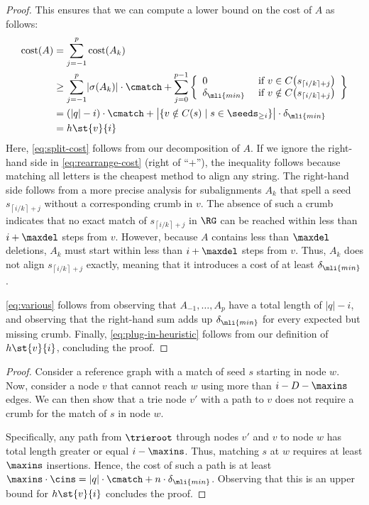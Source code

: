 \begin{proof}
	This ensures that we can compute a lower bound on the cost of $A$ as
	follows:
	\begin{align}
		\text{cost}(A) 
		&= \sum_{j=-1}^{p} \text{cost}(A_k) \label{eq:split-cost} \\
		&\geq \sum_{j=-1}^{p} \lvert \sigma(A_k) \rvert \cdot \cmatch + \sum_{j=0}^{p-1} \left\{ \begin{array}{ll}
			0 & \text{ if } v \in C\!\left(s_{\left\lceil i/k \right\rceil + j}\right) \\
			\delta_\mli{min} & \text{ if } v \notin C\!\left(s_{\left\lceil i/k \right\rceil + j}\right)
		\end{array}\right\} \label{eq:rearrange-cost} \\
		&= (\lvert q \rvert - i) \cdot \cmatch + \big\lvert \{v \notin C(s) \mid s \in \seeds_{\geq i}\} \big\rvert \cdot \delta_\mli{min} \label{eq:various} \\
		&= h\st{v}{i} \label{eq:plug-in-heuristic}
	\end{align}
	Here, \cref{eq:split-cost} follows from our decomposition of $A$. If we
	ignore the right-hand side in \cref{eq:rearrange-cost} (right of ``$+$''),
	the inequality follows because matching all letters is the cheapest method
	to align any string. The right-hand side follows from a more precise
	analysis for subalignments $A_k$ that spell a seed $s_{\left\lceil i/k
	\right\rceil + j}$ without a corresponding crumb in $v$. The absence of such
	a crumb indicates that no exact match of $s_{\left\lceil i/k \right\rceil +
	j}$ in $\RG$ can be reached within less than $i + \maxdel$ steps from $v$.
	However, because $A$ contains less than $\maxdel$ deletions, $A_k$ must
	start within less than $i + \maxdel$ steps from $v$. Thus, $A_k$ does not
	align $s_{\left\lceil i/k \right\rceil + j}$ exactly, meaning that it
	introduces a cost of at least $\delta_\mli{min}$.

	\cref{eq:various} follows from observing that $A_{-1}, \dots, A_p$ have a
	total length of $|q|-i$, and observing that the right-hand sum adds up
	$\delta_{\mli{min}}$ for every expected but missing crumb.
	Finally, \cref{eq:plug-in-heuristic} follows from our definition of
	$h\st{v}{i}$, concluding the proof.
	\qedhere
\end{proof}

\trieOptimization*

\begin{proof}
	Consider a reference graph with a match of seed $s$ starting in node $w$.
	Now, consider a node $v$ that cannot reach $w$ using more than $i-D-\maxins$
	edges.
	We can then show that a trie node $v'$ with a path to $v$ does not require a
	crumb for the match of $s$ in node $w$.

	Specifically, any path from $\trieroot$ through nodes $v'$ and $v$ to node
	$w$ has total length greater or equal $i-\maxins$. Thus, matching $s$ at $w$
	requires at least $\maxins$ insertions. Hence, the cost of such a path is at
	least $\maxins \cdot \cins = |q| \cdot \cmatch + n \cdot
	\delta_{\mli{min}}$. Observing that this is an upper bound for $h\st{v}{i}$
	concludes the proof.
	\qedhere
\end{proof}